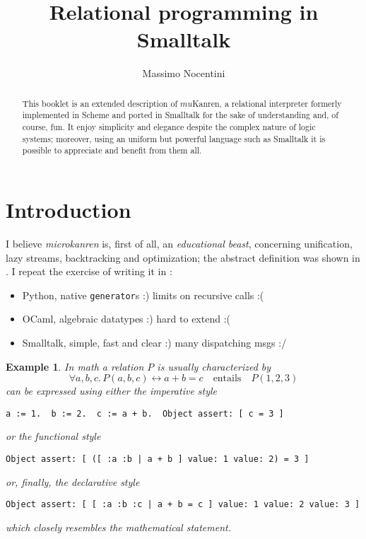 \documentclass[a4paper,12pt]{article}
\author{Massimo Nocentini}
\title{Relational programming in Smalltalk}
\newtheorem{example}[theorem]{Example}
\begin{document}
\maketitle

\begin{abstract}
This booklet is an extended description of $mu$Kanren, a relational interpreter
formerly implemented in Scheme and ported in Smalltalk for the sake of
understanding and, of course, fun. It enjoy simplicity and elegance despite the
complex nature of logic systems; moreover, using an uniform but powerful
language such as Smalltalk it is possible to appreciate and benefit from them
all.
\end{abstract}

\section{Introduction}

I believe \textit{microkanren} is, first of all, an \textit{educational beast},
concerning unification, lazy streams, backtracking and optimization; the
abstract definition was shown in \citep{Hemann:muKanren}.
I repeat the exercise of writing it in \citep{Nocentini:kanrens}:
\begin{itemize}
\item Python, native \verb|generator|s :) limits on recursive calls :(
\item OCaml, algebraic datatypes :) hard to extend :(
\item Smalltalk, simple, fast and clear :) many dispatching msgs :/
\end{itemize}

\begin{example}
In math a relation $P$ is usually characterized by
\begin{displaymath}
\forall a,b,c.\,P(a,b,c) \leftrightarrow a + b = c \quad\text{entails}\quad P(1,2,3)
\end{displaymath}
can be expressed using either the \textit{imperative style}
\begin{verbatim}
a := 1.  b := 2.  c := a + b.  Object assert: [ c = 3 ]
\end{verbatim}
or the \textit{functional style}
\begin{verbatim}
Object assert: [ ([ :a :b | a + b ] value: 1 value: 2) = 3 ]
\end{verbatim}
or, finally, the \textit{declarative style}
\begin{verbatim}
Object assert: [ [ :a :b :c | a + b = c ] value: 1 value: 2 value: 3 ]
\end{verbatim}
which closely resembles the mathematical statement.
\end{example}
\end{document}

